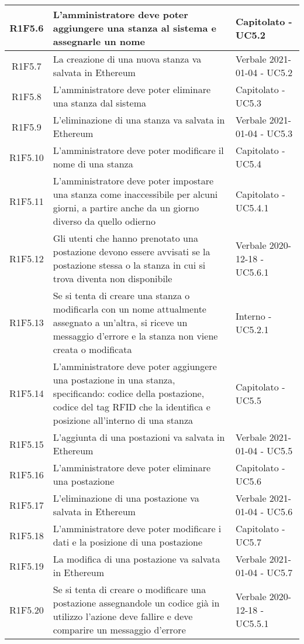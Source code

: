 \begin{center}
\begin{longtable}{|c|p{10cm}|p{4cm}|}
					\hline
				R1F5.6&L'amministratore deve poter aggiungere una stanza al sistema e assegnarle un nome	& Capitolato - UC5.2	\\
						\hline
				R1F5.7&	La creazione di una nuova stanza va salvata in Ethereum&Verbale 2021-01-04 - UC5.2 	\\
						\hline
				R1F5.8&L'amministratore deve poter eliminare una stanza dal sistema	& Capitolato - UC5.3	\\
						\hline
				R1F5.9&L'eliminazione di una stanza va salvata in Ethereum	& Verbale 2021-01-04 - UC5.3	\\
						\hline
				R1F5.10&L'amministratore deve poter modificare il nome di una stanza	& Capitolato - UC5.4	\\
						\hline
			R1F5.11&L'amministratore deve poter impostare una stanza come inaccessibile per alcuni giorni, a partire anche da un giorno diverso da quello odierno	& Capitolato - UC5.4.1	\\
					\hline
			R1F5.12&Gli utenti che hanno prenotato una postazione devono essere avvisati se la postazione stessa o la stanza in cui si trova diventa non disponibile	& Verbale 2020-12-18 - UC5.6.1	\\
					\hline
R1F5.13&Se si tenta di creare una stanza o modificarla con un nome attualmente assegnato a un'altra, si riceve un messaggio d'errore e la stanza non viene creata o modificata	& Interno - UC5.2.1	\\
						\hline
			R1F5.14&L'amministratore deve poter aggiungere una postazione in una stanza, specificando: codice della postazione, codice del tag RFID che la identifica e posizione all'interno di una stanza	& Capitolato - UC5.5	\\
					\hline
			R1F5.15&L'aggiunta di una postazioni va salvata in Ethereum	&Verbale 2021-01-04 - UC5.5 	\\
					\hline
R1F5.16&L'amministratore deve poter eliminare una postazione	& Capitolato - UC5.6	\\
						\hline
		R1F5.17	&L'eliminazione di una postazione va salvata in Ethereum	& Verbale 2021-01-04 - UC5.6	\\
					\hline
			R1F5.18&L'amministratore deve poter modificare i dati e la posizione di una postazione	& Capitolato - UC5.7	\\
					\hline
R1F5.19&	La modifica di una postazione va salvata in Ethereum& Verbale 2021-01-04 - UC5.7	\\
					\hline
R1F5.20&	Se si tenta di creare o modificare una postazione assegnandole un codice già in utilizzo l'azione deve fallire e deve comparire un messaggio d'errore& Verbale 2020-12-18 - UC5.5.1 	\\

\end{longtable}
\end{center}
